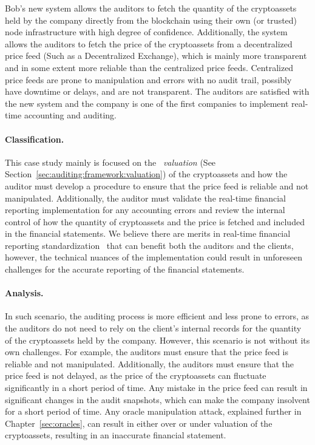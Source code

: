 Bob's new system allows the auditors to fetch the quantity of the cryptoassets held by the company directly from the blockchain using their own (or trusted) node infrastructure with high degree of confidence. Additionally, the system allows the auditors to fetch the price of the cryptoassets from a decentralized price feed (Such as a Decentralized Exchange), which is mainly more transparent and in some extent more reliable than the centralized price feeds. Centralized price feeds are prone to manipulation and errors with no audit trail, possibly have downtime or delays, and are not transparent. The auditors are satisfied with the new system and the company is one of the first companies to implement real-time accounting and auditing. 

\paragraph{Classification.} This case study mainly is focused on the ~\textit{valuation} (See Section~\ref{sec:auditing:framework:valuation}) of the cryptoassets and how the auditor must develop a procedure to ensure that the price feed is reliable and not manipulated. Additionally, the auditor must validate the real-time financial reporting implementation for any accounting errors and review the internal control of how the quantity of cryptoassets and the price is fetched and included in the financial statements. We believe there are merits in real-time financial reporting standardization~\cite{bakarich2020use,yu2018blockchain} that can benefit both the auditors and the clients, however, the technical nuances of the implementation could result in unforeseen challenges for the accurate reporting of the financial statements.


\paragraph{Analysis.} In such scenario, the auditing process is more efficient and less prone to errors, as the auditors do not need to rely on the client's internal records for the quantity of the cryptoassets held by the company. However, this scenario is not without its own challenges. For example, the auditors must ensure that the price feed is reliable and not manipulated. Additionally, the auditors must ensure that the price feed is not delayed, as the price of the cryptoassets can fluctuate significantly in a short period of time. Any mistake in the price feed can result in significant changes in the audit snapshots, which can make the company insolvent for a short period of time. Any oracle manipulation attack, explained further in Chapter~\ref{sec:oracles}, can result in either over or under valuation of the cryptoassets, resulting in an inaccurate financial statement.




